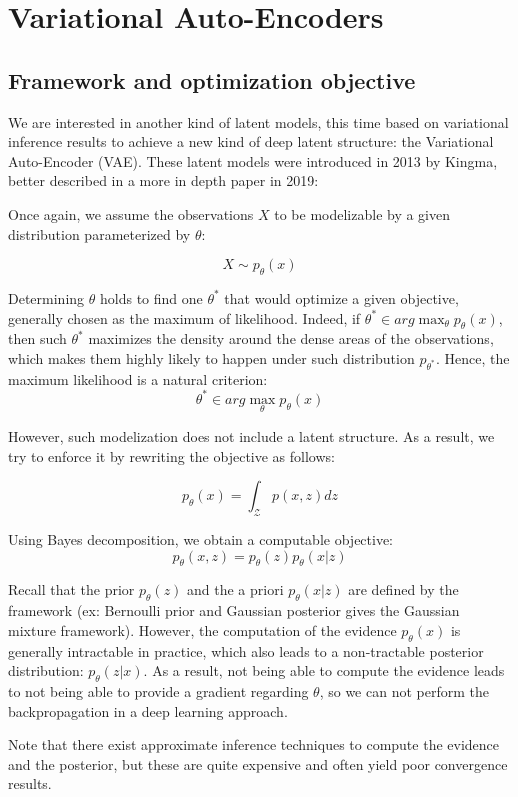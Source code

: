 \section{Variational Auto-Encoders}

\subsection{Framework and optimization objective}

We are interested in another kind of latent models, this time based on variational inference
results to achieve a new kind of deep latent structure: the Variational Auto-Encoder (VAE).
These latent models were introduced in 2013 by Kingma, better described in a more in depth paper in 2019: \cite{kingma2019introduction}

Once again, we assume the observations $X$ to be modelizable by a given distribution
parameterized by $\theta$:

$$
X \sim p_{\theta}(x)
$$

Determining $\theta$ holds to find one $\theta^*$ that would optimize a given objective, generally chosen as the maximum of likelihood. Indeed, if $\theta^* \in arg\max_{\theta} p_{\theta}(x)$, then such $\theta^*$ maximizes the density around the dense areas of the observations, which makes them highly likely to happen under such distribution $p_{\theta^*}$. Hence, the maximum likelihood is a natural criterion:
$$
\theta^* \in arg\max_{\theta} p_{\theta}(x)
$$

However, such modelization does not include a latent structure. As a result, we try to enforce it by rewriting the objective as follows:

$$
p_{\theta}(x) = \int_{\mathcal{Z}} p(x,z) dz 
$$

Using Bayes decomposition, we obtain a computable objective:
$$
p_{\theta}(x,z) = p_{\theta}(z) p_{\theta}(x|z)
$$

Recall that the prior $p_{\theta}(z)$ and the a priori $p_{\theta}(x|z)$ are defined by the framework (ex: Bernoulli prior and Gaussian posterior gives the Gaussian mixture framework). However, the computation of the evidence $p_{\theta}(x)$ is generally intractable in practice, which also leads to a non-tractable posterior distribution: $p_{\theta}(z|x)$. As a result, not being able to compute the evidence leads to not being able to provide a gradient regarding $\theta$, so we can not perform the backpropagation in a deep learning approach.

Note that there exist approximate inference techniques to compute the evidence and the posterior, but these are quite expensive and often yield poor convergence results.


